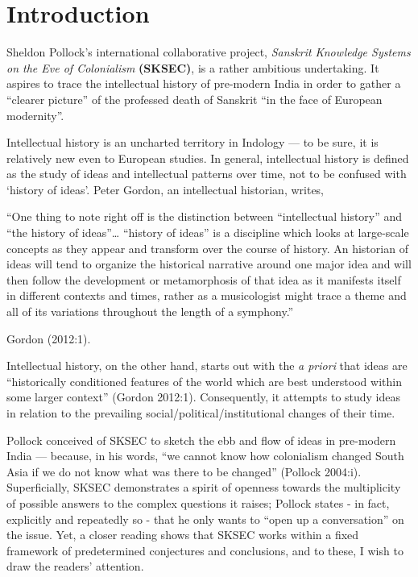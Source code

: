 \section*{Introduction}

Sheldon Pollock’s international collaborative project, {\sl Sanskrit Knowledge Systems on the Eve of Colonialism} {\bf(SKSEC)}, is a rather ambitious undertaking. It aspires to trace the intellectual history of pre-modern India in order to gather a “clearer picture” of the professed death of Sanskrit “in the face of European modernity”. 

Intellectual history is an uncharted territory in Indology — to be sure, it is relatively new even to European studies. In general, intellectual history is defined as the study of ideas and intellectual patterns over time, not to be confused with ‘history of ideas’. Peter Gordon, an intellectual historian, writes, 
\begin{myquote}
“One thing to note right off is the distinction between “intellectual history” and “the history of ideas”… “history of ideas” is a discipline which looks at large-scale concepts as they appear and transform over the course of history. An historian of ideas will tend to organize the historical narrative around one major idea and will then follow the development or metamorphosis of that idea as it manifests itself in different contexts and times, rather as a musicologist might trace a theme and all of its variations throughout the length of a symphony.” 

\hfill{Gordon (2012:1).}
\end{myquote}

Intellectual history, on the other hand, starts out with the  {\sl a priori} that ideas are “historically conditioned features of the world which are best understood within some larger context”  (Gordon 2012:1). Consequently, it attempts to study ideas in relation to the prevailing social/political/institutional changes of their time. 

Pollock conceived of SKSEC to sketch the ebb and flow of ideas in pre-modern India — because, in his words, “we cannot know how colonialism changed South Asia if we do not know what was there to be changed” (Pollock 2004:i). Superficially, SKSEC demonstrates a spirit of openness towards the multiplicity of possible answers to the complex questions it raises; Pollock states - in fact, explicitly and repeatedly so - that he only wants to “open up a conversation” on the issue. Yet, a closer reading shows that SKSEC works within a fixed framework of predetermined conjectures and conclusions, and to these, I wish to draw the readers’ attention. 

